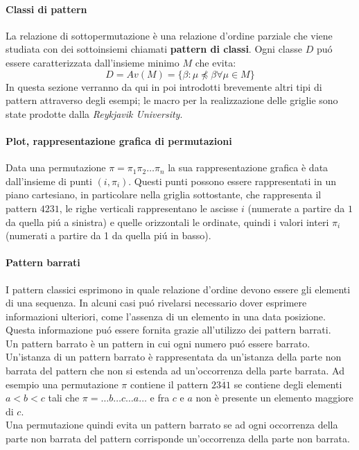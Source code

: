 \paragraph*{Classi di pattern} La relazione {di sottopermutazione} \`e una relazione d'ordine parziale {che viene studiata con dei sottoinsiemi chiamati \textbf{pattern di classi}}. Ogni classe $D$ pu\'o essere caratterizzata dall'insieme {minimo} $M$ che evita:$$ D = Av(M) = \{\beta:\mu\not\preceq\beta\forall\mu\in M\}$$
In questa sezione verranno da qui in poi introdotti brevemente altri tipi di pattern\cite{branden2011mesh} attraverso degli esempi; le macro per la realizzazione delle griglie sono state prodotte dalla \textit{Reykjavik University}\cite{patternmacros}.
\paragraph*{Plot, rappresentazione grafica di permutazioni} Data una permutazione $\pi = \pi_1\pi_2\dots\pi_n$ la sua rappresentazione grafica \`e data dall'insieme di punti $(i,\pi_i)$. Questi punti possono essere rappresentati in un piano cartesiano, in particolare nella griglia sottostante, che rappresenta il pattern $4231$, le righe verticali rappresentano le ascisse $i$ (numerate a partire da $1$ da quella pi\'u a sinistra) e quelle orizzontali le ordinate, quindi i valori interi $\pi_i$ (numerati a partire da 1 da quella pi\'u in basso).
\begin{center}\end{center}
\paragraph*{Pattern barrati} I pattern classici esprimono in quale relazione d'ordine devono essere gli elementi di una sequenza. In alcuni casi pu\'o rivelarsi necessario dover esprimere informazioni ulteriori, come l'assenza di un elemento in una data posizione. Questa informazione pu\'o essere fornita grazie all'utilizzo dei pattern barrati.\\
Un pattern barrato \`e un pattern in cui ogni numero pu\'o essere barrato.\\
Un'istanza di un pattern barrato \`e rappresentata da un'istanza della parte non barrata del pattern che non si estenda ad un'occorrenza della parte barrata. Ad esempio una permutazione $\pi$ contiene il pattern $23\overline{4}1$ se contiene degli elementi $a<b<c$ tali che $\pi=\dots b \dots c \dots a\dots$ e fra $c$ e $a$ non \`e presente un elemento maggiore di $c$.\\
Una permutazione quindi evita un pattern barrato se ad ogni occorrenza della parte non barrata del pattern corrisponde un'occorrenza della parte non barrata.
